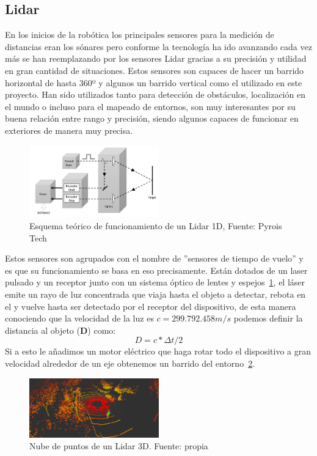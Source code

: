 \subsection{Lidar}
En los inicios de la robótica los principales sensores para la medición de distancias eran los sónares pero conforme la tecnología ha ido avanzando 
cada vez más se han reemplazando por los sensores Lidar gracias a su precisión y utilidad en gran cantidad de situaciones. 
Estos sensores son capaces de hacer un barrido horizontal de hasta 360º y algunos un barrido vertical como el utilizado en este proyecto. 
Han sido utilizados tanto para detección de obstáculos, localización en el mundo o incluso para el mapeado de entornos, son muy interesantes 
por su buena relación entre rango y precisión, siendo algunos capaces de funcionar en exteriores de manera muy precisa.

\begin{figure}[H]
    \centering
    \includegraphics[width=0.5\textwidth]{images/lidar_explicacion.png}
    \caption{Esquema teórico de funcionamiento de un Lidar 1D, Fuente: Pyrois Tech}
    \label{fig:lidar_explicacion}
\end{figure}

Estos sensores son agrupados con el nombre de ''sensores de tiempo de vuelo'' y es que su funcionamiento se basa en eso precisamente. Están 
dotados de un laser pulsado y un receptor junto con un sistema óptico de lentes y espejos~\ref{fig:lidar_explicacion}, el láser emite un rayo de luz concentrada que viaja 
hasta el objeto a detectar, rebota en el y vuelve hasta ser detectado por el receptor del dispositivo, de esta manera conociendo que la 
velocidad de la luz es \begin{math}c=299.792.458 m/s\end{math} podemos definir la distancia al objeto (\textbf{D}) como:~$$D = c * \Delta{t} / 2$$ Si a esto 
le añadimos un motor eléctrico que haga rotar todo el dispositivo a gran velocidad alrededor de un eje obtenemos un 
barrido del entorno~\ref{fig:lidar3d}.


\begin{figure}[h]
    \centering
    \includegraphics[width=0.5\textwidth]{images/lidar3d_1.png}
    \caption{Nube de puntos de un Lidar 3D. Fuente: propia}
    \label{fig:lidar3d}
\end{figure}

